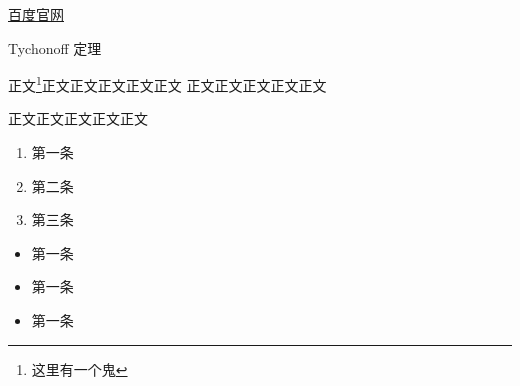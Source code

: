 

\begin{issues}
\issueDraft
\end{issues}

\href{http://www.baidu.com}{百度官网}






Tychonoff 定理 %

正文\footnote{这里有一个鬼}正文正文正文正文正文\cite{Cui1}
正文正文正文正文正文

正文正文正文正文正文

\begin{enumerate}
\item 第一条
\item 第二条
\item 第三条
\end{enumerate}

\begin{itemize}
\item 第一条
\item 第一条
\item 第一条
\end{itemize}
